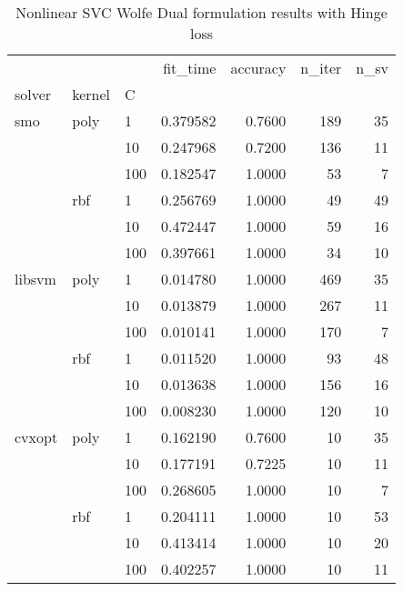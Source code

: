 \begin{table}[H]
\centering
\caption{Nonlinear SVC Wolfe Dual formulation results with Hinge loss}
\label{nonlinear_dual_svc_cv_results}
\begin{tabular}{lllrrrr}
\toprule
       &     &     &  fit\_time &  accuracy &  n\_iter &  n\_sv \\
solver & kernel & C &           &           &         &       \\
\midrule
smo & poly & 1   &  0.379582 &    0.7600 &     189 &    35 \\
       &     & 10  &  0.247968 &    0.7200 &     136 &    11 \\
       &     & 100 &  0.182547 &    1.0000 &      53 &     7 \\
       & rbf & 1   &  0.256769 &    1.0000 &      49 &    49 \\
       &     & 10  &  0.472447 &    1.0000 &      59 &    16 \\
       &     & 100 &  0.397661 &    1.0000 &      34 &    10 \\
libsvm & poly & 1   &  0.014780 &    1.0000 &     469 &    35 \\
       &     & 10  &  0.013879 &    1.0000 &     267 &    11 \\
       &     & 100 &  0.010141 &    1.0000 &     170 &     7 \\
       & rbf & 1   &  0.011520 &    1.0000 &      93 &    48 \\
       &     & 10  &  0.013638 &    1.0000 &     156 &    16 \\
       &     & 100 &  0.008230 &    1.0000 &     120 &    10 \\
cvxopt & poly & 1   &  0.162190 &    0.7600 &      10 &    35 \\
       &     & 10  &  0.177191 &    0.7225 &      10 &    11 \\
       &     & 100 &  0.268605 &    1.0000 &      10 &     7 \\
       & rbf & 1   &  0.204111 &    1.0000 &      10 &    53 \\
       &     & 10  &  0.413414 &    1.0000 &      10 &    20 \\
       &     & 100 &  0.402257 &    1.0000 &      10 &    11 \\
\bottomrule
\end{tabular}
\end{table}

